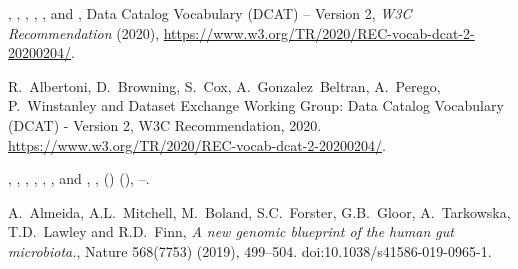 \documentclass[ds,v1.1.2,openaccess]{iosart2x}%
\begin{document}
\begin{thebibliography}{}
%
\begin{botherref}
,
,
,
,
,
 and
,
Data Catalog Vocabulary
({DCAT}) -- Version 2,
\textit{{W3C} Recommendation}
(2020),
\url{https://www.w3.org/TR/2020/REC-vocab-dcat-2-20200204/}.
\end{botherref}
%
\OrigBibText
R.~Albertoni,
D.~Browning,
S.~Cox,
A.~Gonzalez~Beltran,
A.~Perego,
P.~Winstanley and
Dataset Exchange Working Group:
Data Catalog Vocabulary ({DCAT}) - Version 2,
{W3C} Recommendation,
2020.
\url{https://www.w3.org/TR/2020/REC-vocab-dcat-2-20200204/}.
\endOrigBibText
{}
\endbibitem

%
\begin{barticle}
,
,
,
,
,
,
 and
,
,
()
(),
--.
\end{barticle}
%
\OrigBibText
A.~Almeida,
A.L.~Mitchell,
M.~Boland,
S.C.~Forster,
G.B.~Gloor,
A.~Tarkowska,
T.D.~Lawley and
R.D.~Finn,
\textit{A new genomic blueprint of the human gut microbiota.},
Nature
568(7753)
(2019),
499--504.
doi:10.1038/s41586-019-0965-1.
\endOrigBibText
{}
\endbibitem


\end{thebibliography}
\end{document}
